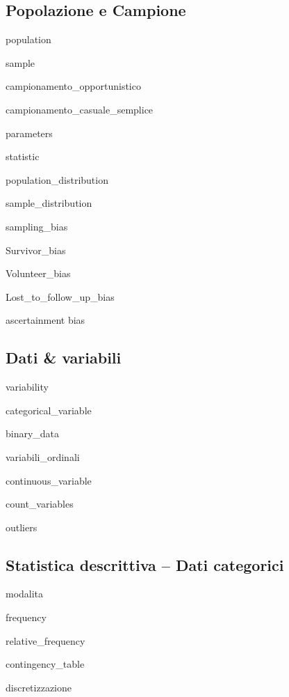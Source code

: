 \documentclass{report}
\begin{document}
\subsection*{Popolazione e Campione}

\noindent \gls{population}

\noindent \gls{sample}

\noindent \gls{campionamento_opportunistico}

\noindent \gls{campionamento_casuale_semplice}

\noindent \gls{parameters}

\noindent \gls{statistic}

\noindent \gls{population_distribution}

\noindent \gls{sample_distribution}

\noindent \gls{sampling_bias}

\noindent \gls{Survivor_bias}

\noindent \gls{Volunteer_bias}

\noindent \gls{Lost_to_follow_up_bias}

\noindent \gls{ascertainment bias}




\subsection*{Dati \& variabili}

\noindent \gls{variability}

\noindent \gls{categorical_variable}

\noindent \gls{binary_data}

\noindent \gls{variabili_ordinali}

\noindent \gls{continuous_variable}

\noindent \gls{count_variables}

\noindent \gls{outliers}

\subsection*{Statistica descrittiva -- Dati categorici}

\noindent \gls{modalita}

\noindent \gls{frequency}

\noindent \gls{relative_frequency}

\noindent \gls{contingency_table}

\noindent \gls{discretizzazione}
\end{document}
